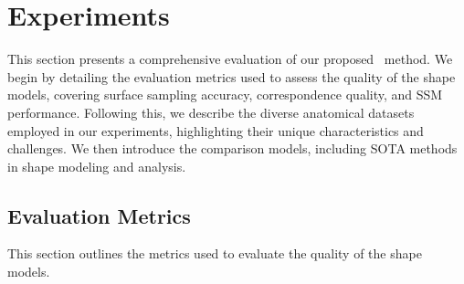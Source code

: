 \section{Experiments}
This section presents a comprehensive evaluation of our proposed \model~method. We begin by detailing the evaluation metrics used to assess the quality of the shape models, covering surface sampling accuracy, correspondence quality, and SSM performance. Following this, we describe the diverse anatomical datasets employed in our experiments, highlighting their unique characteristics and challenges. We then introduce the comparison models, including SOTA methods in shape modeling and analysis. 

\subsection{Evaluation Metrics} \label{metrics}
This section outlines the metrics used to evaluate the quality of the shape models. 
